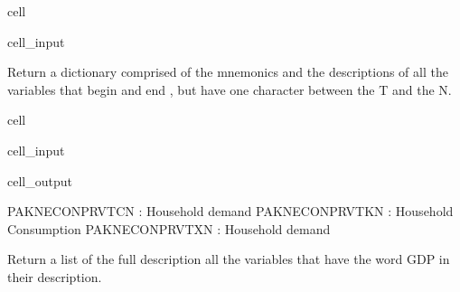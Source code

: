 \documentclass[letterpaper,10pt,english]{jupyterBook}
\begin{document}
\begin{sphinxuseclass}{cell}
\begin{sphinxVerbatimInput}
\begin{sphinxuseclass}{cell_input}
\begin{sphinxVerbatim}[commandchars=\\\{\}]


\end{sphinxVerbatim}

\end{sphinxuseclass}\end{sphinxVerbatimInput}

\end{sphinxuseclass}
\sphinxAtStartPar
Return a dictionary comprised of the mnemonics and the descriptions of all the variables that begin  and end , but have one character between the T and the N.

\begin{sphinxuseclass}{cell}\begin{sphinxVerbatimInput}

\begin{sphinxuseclass}{cell_input}
\begin{sphinxVerbatim}[commandchars=\\\{\}]
\PYG{p}{[}\PYG{p}{]}
\end{sphinxVerbatim}

\end{sphinxuseclass}\end{sphinxVerbatimInput}
\begin{sphinxVerbatimOutput}

\begin{sphinxuseclass}{cell_output}
\begin{sphinxVerbatim}[commandchars=\\\{\}]
PAKNECONPRVTCN : Household demand
PAKNECONPRVTKN : Household Consumption
PAKNECONPRVTXN : Household demand
\end{sphinxVerbatim}

\end{sphinxuseclass}\end{sphinxVerbatimOutput}

\end{sphinxuseclass}
\sphinxAtStartPar
Return a list of the full description  all the variables that have the word GDP in their description.
\end{document}
